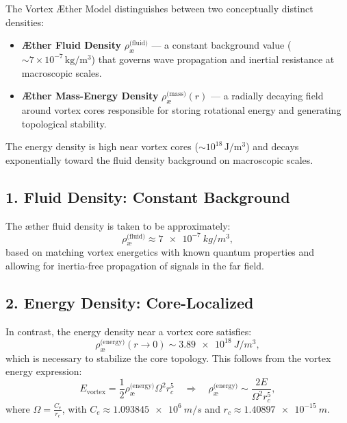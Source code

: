 The Vortex Æther Model distinguishes between two conceptually distinct densities:

\begin{itemize}
    \item \textbf{Æther Fluid Density} \(\rho_{\text{\ae}}^{\text{(fluid)}}\) — a constant background value (\(\sim 7 \times 10^{-7}\, \mathrm{kg/m^3}\)) that governs wave propagation and inertial resistance at macroscopic scales.
    \item \textbf{Æther Mass-Energy Density} \(\rho_{\text{\ae}}^{\text{(mass)}}(r)\) — a radially decaying field around vortex cores responsible for storing rotational energy and generating topological stability.
\end{itemize}

The energy density is high near vortex cores (\(\sim 10^{18}\, \mathrm{J/m^3}\)) and decays exponentially toward the fluid density background on
macroscopic scales.


\subsection*{1. Fluid Density: Constant Background}

The æther fluid density is taken to be approximately:
\begin{equation}
    \rho_{\text{\ae}}^{\text{(fluid)}} \approx \SI{7e-7}{kg/m^3},
\end{equation}
based on matching vortex energetics with known quantum properties and allowing for inertia-free propagation of signals in the far field.

\subsection*{2. Energy Density: Core-Localized}

In contrast, the energy density near a vortex core satisfies:
\begin{equation}
    \rho_{\text{\ae}}^{\text{(energy)}}(r \to 0) \sim \SI{3.89e18}{J/m^3},
\end{equation}
which is necessary to stabilize the core topology. This follows from the vortex energy expression:
\begin{equation}
    E_{\text{vortex}} = \frac{1}{2} \rho_{\text{\ae}}^{\text{(energy)}} \Omega^2 r_c^5
    \quad\Rightarrow\quad
    \rho_{\text{\ae}}^{\text{(energy)}} \sim \frac{2E}{\Omega^2 r_c^5},
\end{equation}
where \( \Omega = \frac{C_e}{r_c} \), with \( C_e \approx \SI{1.093845e6}{m/s} \) and \( r_c \approx \SI{1.40897e-15}{m} \).

